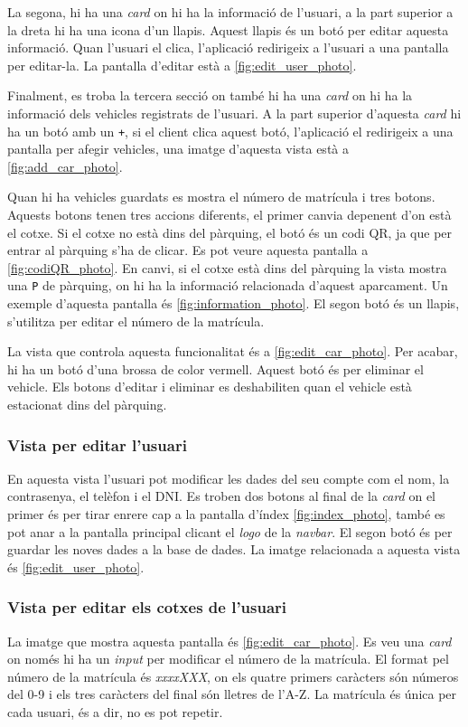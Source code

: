 La segona, hi ha una \emph{card} on hi ha la informació de l'usuari, a la part superior a la dreta
hi ha una icona d'un llapis. Aquest llapis és un botó per editar aquesta informació. Quan l'usuari
el clica, l'aplicació redirigeix a l'usuari a una pantalla per editar-la. La pantalla d'editar està a
\autoref{fig:edit_user_photo}.

Finalment, es troba la tercera secció on també hi ha una \emph{card} on hi ha la informació dels vehicles
registrats de l'usuari. A la part superior d'aquesta \emph{card} hi ha un botó amb un \texttt{+},
si el client clica aquest botó, l'aplicació el redirigeix a una pantalla
per afegir vehicles, una imatge d'aquesta vista està a \autoref{fig:add_car_photo}.

Quan hi ha vehicles guardats es mostra el número de matrícula i tres botons. Aquests botons tenen tres
accions diferents, el primer canvia depenent d'on està el cotxe. Si el cotxe no està dins del pàrquing,
el botó és un codi QR, ja que per entrar al pàrquing s'ha de clicar. Es pot veure aquesta pantalla a
\autoref{fig:codiQR_photo}. En canvi, si el cotxe està dins del pàrquing la vista mostra una \texttt{P}
de pàrquing, on hi ha la informació relacionada d'aquest aparcament.
Un exemple d'aquesta pantalla és \autoref{fig:information_photo}.
El segon botó és un llapis, s'utilitza per editar el número de la matrícula.

La vista que controla aquesta funcionalitat és a \autoref{fig:edit_car_photo}. Per acabar, hi ha un botó
d'una brossa de color vermell. Aquest botó és per eliminar el vehicle.
Els botons d'editar i eliminar es deshabiliten quan el vehicle està estacionat dins del pàrquing.

\subsubsection{Vista per editar l'usuari}
En aquesta vista l'usuari pot modificar les dades del seu compte com el nom, la contrasenya, el telèfon i el DNI.
Es troben dos botons al final de la \emph{card} on el primer és per tirar enrere cap a la pantalla d'índex
\autoref{fig:index_photo}, també es pot anar a la pantalla principal clicant el \emph{logo} de la \emph{navbar}.
El segon botó és per guardar les noves dades a la base de dades. La imatge relacionada a aquesta vista és \autoref{fig:edit_user_photo}.

\subsubsection{Vista per editar els cotxes de l'usuari}
La imatge que mostra aquesta pantalla és \autoref{fig:edit_car_photo}. Es veu una \emph{card} on només hi ha un \emph{input}
per modificar el número de la matrícula.
El format pel número de la matrícula és \emph{xxxxXXX}, on els quatre primers caràcters són números del 0-9
i els tres caràcters del final són lletres de l'A-Z. La matrícula és única per cada usuari, és a dir, no es pot repetir.

